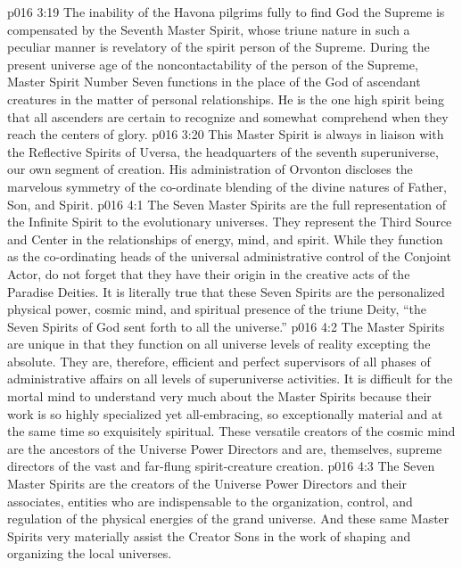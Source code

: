 \vs p016 3:19 The inability of the Havona pilgrims fully to find God the Supreme is compensated by the Seventh Master Spirit, whose triune nature in such a peculiar manner is revelatory of the spirit person of the Supreme. During the present universe age of the noncontactability of the person of the Supreme, Master Spirit Number Seven functions in the place of the God of ascendant creatures in the matter of personal relationships. He is the one high spirit being that all ascenders are certain to recognize and somewhat comprehend when they reach the centers of glory.
\vs p016 3:20 This Master Spirit is always in liaison with the Reflective Spirits of Uversa, the headquarters of the seventh superuniverse, our own segment of creation. His administration of Orvonton discloses the marvelous symmetry of the co\hyp{}ordinate blending of the divine natures of Father, Son, and Spirit.
\vs p016 4:1 The Seven Master Spirits are the full representation of the Infinite Spirit to the evolutionary universes. They represent the Third Source and Center in the relationships of energy, mind, and spirit. While they function as the co\hyp{}ordinating heads of the universal administrative control of the Conjoint Actor, do not forget that they have their origin in the creative acts of the Paradise Deities. It is literally true that these Seven Spirits are the personalized physical power, cosmic mind, and spiritual presence of the triune Deity, “the Seven Spirits of God sent forth to all the universe.”
\vs p016 4:2 The Master Spirits are unique in that they function on all universe levels of reality excepting the absolute. They are, therefore, efficient and perfect supervisors of all phases of administrative affairs on all levels of superuniverse activities. It is difficult for the mortal mind to understand very much about the Master Spirits because their work is so highly specialized yet all\hyp{}embracing, so exceptionally material and at the same time so exquisitely spiritual. These versatile creators of the cosmic mind are the ancestors of the Universe Power Directors and are, themselves, supreme directors of the vast and far\hyp{}flung spirit\hyp{}creature creation.
\vs p016 4:3 The Seven Master Spirits are the creators of the Universe Power Directors and their associates, entities who are indispensable to the organization, control, and regulation of the physical energies of the grand universe. And these same Master Spirits very materially assist the Creator Sons in the work of shaping and organizing the local universes.
